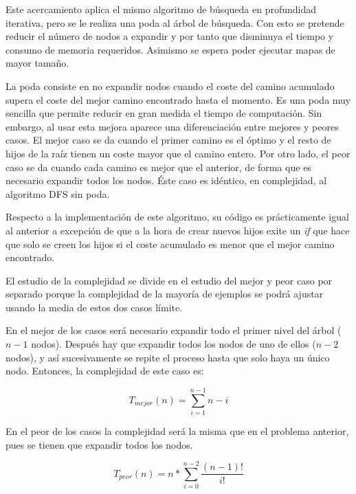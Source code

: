 \documentclass{uc3mpracticas}
\begin{document}
  Este acercamiento aplica el mismo algoritmo de búsqueda en profundidad iterativa, pero se le realiza una poda al árbol de búsqueda. Con esto se pretende reducir el número de nodos a expandir y por tanto que disminuya el tiempo y consumo de memoria requeridos. Asimismo se espera poder ejecutar mapas de mayor tamaño.

  \vspace{2mm}

  La poda consiste en no expandir nodos cuando el coste del camino acumulado supera el coste del mejor camino encontrado hasta el momento. Es una poda muy sencilla que permite reducir en gran medida el tiempo de computación. Sin embargo, al usar esta mejora aparece una diferenciación entre mejores y peores casos. El mejor caso se da cuando el primer camino es el óptimo y el resto de hijos de la raíz tienen un coste mayor que el camino entero. Por otro lado, el peor caso se da cuando cada camino es mejor que el anterior, de forma que es necesario expandir todos los nodos. Éste caso es idéntico, en complejidad, al algoritmo DFS sin poda.

  \vspace{2mm}

  Respecto a la implementación de este algoritmo, su código es prácticamente igual al anterior a excepción de que a la hora de crear nuevos hijos exite un \textit{if} que hace que solo se creen los hijos si el coste acumulado es menor que el mejor camino encontrado.

  \vspace{2mm}

  El estudio de la complejidad se divide en el estudio del mejor y peor caso por separado porque la complejidad de la mayoría de ejemplos se podrá ajustar usando la media de estos dos casos límite.

  \vspace{2mm}

  En el mejor de los casos será necesario expandir todo el primer nivel del árbol ($n-1$ nodos). Después hay que expandir todos los nodos de uno de ellos ($n-2$ nodos), y así sucesivamente se repite el proceso hasta que solo haya un único nodo. Entonces, la complejidad de este caso es:

  $$ T_{mejor}(n) = \displaystyle\sum_{i=1}^{n-1} n-i $$


  En el peor de los casos la complejidad será la misma que en el problema anterior, pues se tienen que expandir todos los nodos.

  $$ T_{peor}(n) = n * \displaystyle\sum_{i=0}^{n-2} \frac{(n-1)!}{i!} $$
\end{document}
